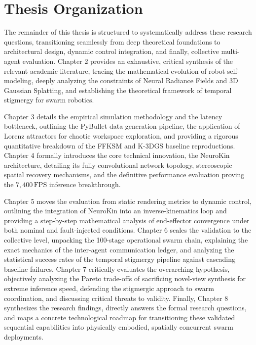 \documentclass[12pt,a4paper,oneside]{report}
\begin{document}
\section{Thesis Organization}

The remainder of this thesis is structured to systematically address these research questions, transitioning seamlessly from deep theoretical foundations to architectural design, dynamic control integration, and finally, collective multi-agent evaluation. Chapter 2 provides an exhaustive, critical synthesis of the relevant academic literature, tracing the mathematical evolution of robot self-modeling, deeply analyzing the constraints of Neural Radiance Fields and 3D Gaussian Splatting, and establishing the theoretical framework of temporal stigmergy for swarm robotics. 

Chapter 3 details the empirical simulation methodology and the latency bottleneck, outlining the PyBullet data generation pipeline, the application of Lorenz attractors for chaotic workspace exploration, and providing a rigorous quantitative breakdown of the FFKSM and K-3DGS baseline reproductions. Chapter 4 formally introduces the core technical innovation, the NeuroKin architecture, detailing its fully convolutional network topology, stereoscopic spatial recovery mechanisms, and the definitive performance evaluation proving the $7{,}400\,\mathrm{FPS}$ inference breakthrough. 

Chapter 5 moves the evaluation from static rendering metrics to dynamic control, outlining the integration of NeuroKin into an inverse-kinematics loop and providing a step-by-step mathematical analysis of end-effector convergence under both nominal and fault-injected conditions. Chapter 6 scales the validation to the collective level, unpacking the 100-stage operational swarm chain, explaining the exact mechanics of the inter-agent communication ledger, and analyzing the statistical success rates of the temporal stigmergy pipeline against cascading baseline failures. Chapter 7 critically evaluates the overarching hypothesis, objectively analyzing the Pareto trade-offs of sacrificing novel-view synthesis for extreme inference speed, defending the stigmergic approach to swarm coordination, and discussing critical threats to validity. Finally, Chapter 8 synthesizes the research findings, directly answers the formal research questions, and maps a concrete technological roadmap for transitioning these validated sequential capabilities into physically embodied, spatially concurrent swarm deployments.
\end{document}
